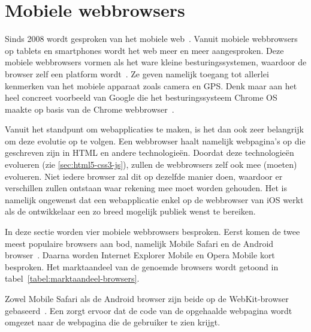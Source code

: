 \section{Mobiele webbrowsers}
\label{sec:mobiele-webbrowsers}
Sinds 2008 wordt gesproken van het mobiele web~\cite{Hales2012}. 
Vanuit mobiele webbrowsers op tablets en smartphones wordt het web meer en meer aangesproken. 
Deze mobiele webbrowsers vormen als het ware kleine besturingssystemen, waardoor de browser zelf een platform wordt~\cite{Hales2012}. 
Ze geven namelijk toegang tot allerlei kenmerken van het mobiele apparaat zoals camera en GPS. 
Denk maar aan het heel concreet voorbeeld van Google die het besturingssysteem Chrome OS maakte op basis van de Chrome webbrowser~\cite{Hales2012}.

Vanuit het standpunt om webapplicaties te maken, is het dan ook zeer belangrijk om deze evolutie op te volgen. 
Een webbrowser haalt namelijk webpagina's op die geschreven zijn in HTML en andere technologieën. 
Doordat deze technologieën evolueren (zie \ref{sec:html5-css3-js}), zullen de webbrowsers zelf ook mee (moeten) evolueren. 
Niet iedere browser zal dit op dezelfde manier doen, waardoor er verschillen zullen ontstaan waar  rekening mee moet worden gehouden. 
Het is namelijk ongewenst dat een webapplicatie enkel op de webbrowser van iOS werkt als de ontwikkelaar een zo breed mogelijk publiek wenst te bereiken. 

In deze sectie worden vier mobiele webbrowsers besproken. 
Eerst komen de twee meest populaire browsers aan bod, namelijk Mobile Safari en de Android browser~\cite{Hales2012}. 
Daarna worden Internet Explorer Mobile en Opera Mobile kort besproken. 
Het marktaandeel van de genoemde browsers wordt getoond in tabel~\ref{tabel:marktaandeel-browsers}.

Zowel Mobile Safari als de Android browser zijn beide op de WebKit-browser  gebaseerd~\cite{Oeflman2011}. 
Een  zorgt ervoor dat de code van de opgehaalde webpagina wordt omgezet naar de webpagina die de gebruiker te zien krijgt. 

\begin{table}[H]
\centering
{}
\caption{Marktaandeel mobiele webbrowsers in mei 2013~\cite{NetApplications2012}.}
\label{tabel:marktaandeel-browsers}
\end{table}

